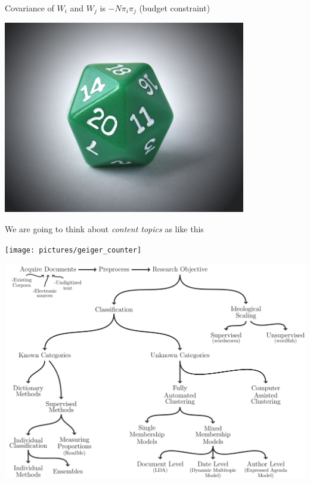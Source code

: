 \documentclass{mediumfoils}
\begin{document}
Covariance of $W_{i}$ and $W_{j}$ is $-N \pi_{i}\pi_{j}$ (budget constraint)


\centerline{\includegraphics[scale=1]{pictures/20-sided-die}}


We are going to think about \textit{content topics} as like this


\centerline{\texttt{[image: pictures/geiger\_counter]}}


\centerline{\includegraphics[scale=.5]{pictures/tad-picture}}

\end{document}
